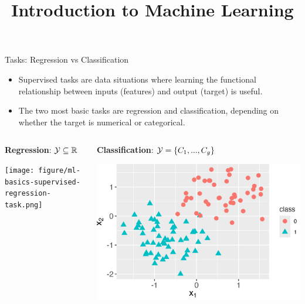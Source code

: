 \documentclass[11pt,compress,t,notes=noshow, xcolor=table]{beamer}
\title{Introduction to Machine Learning}
\begin{document}



\begin{vbframe}{Tasks: Regression vs Classification}

\begin{itemize}
    \item Supervised tasks are data situations where learning the functional
        relationship between inputs (features) and output (target) is
        useful.
    
    \item The two most basic tasks are 
        regression and classification, depending on whether the 
        target is numerical or categorical.
\end{itemize}  

\lz

\begin{columns}    
\begin{column}{0.5\textwidth} 
\textbf{Regression}: $\mathcal{Y} \subseteq \mathbb{R}$

  \begin{center}
    \texttt{[image: figure/ml-basics-supervised-regression-task.png]} 
  \end{center}
\end{column}    

\begin{column}{0.5\textwidth} 
\textbf{Classification}: $\mathcal{Y} = \{C_1,...,C_g\}$
  
  \begin{center}
    \includegraphics[width=\textwidth]{figure/ml-basics-supervised-classif-task.png} 
  \end{center}
\end{column}    
\end{columns}    
  
\end{vbframe}
\end{document}
